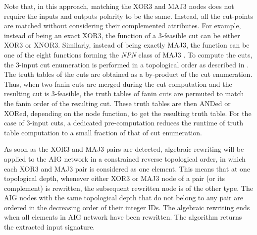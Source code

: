 Note that, in this approach, matching the XOR3 and MAJ3 nodes does not require the inputs and outputs polarity to be the same. Instead, all the cut-points are matched without considering their complemented attributes. For example, instead of being an exact XOR3, the function of a 3-feasible cut can be either XOR3 or XNOR3. Similarly, instead of being exactly MAJ3, the function can be one of the eight functions forming the \textit{NPN} class of MAJ3 \cite{HuangWNM13}. To compute the cuts, the 3-input cut enumeration is performed in a {topological order} as described in \cite{PanL98}. The truth tables of the cuts are obtained as a by-product of the cut enumeration. Thus, when two fanin cuts are merged during the cut computation and the resulting cut is 3-feasible, the truth tables of fanin cuts are permuted to match the fanin order of the resulting cut. These truth tables are then ANDed or XORed, depending on the {\color{red}node function}, to get the resulting truth table. For the case of 3-input cuts, a dedicated pre-computation reduces the runtime of truth table computation to a small fraction of that of cut enumeration.


As soon as the XOR3 and MAJ3 pairs are detected, algebraic rewriting will be applied to the AIG network in a constrained {\color{red}reverse topological order}, in which each XOR3 and MAJ3 pair is considered as one element. This means that at one topological depth, whenever either XOR3 or MAJ3 node of a pair (or its complement) is rewritten, the subsequent rewritten node is of the other type. The AIG nodes with the same topological depth that do not belong to any pair are ordered in the decreasing order of their integer IDs. The algebraic rewriting ends when all elements in AIG network have been rewritten. The algorithm returns the extracted input signature. 


%




